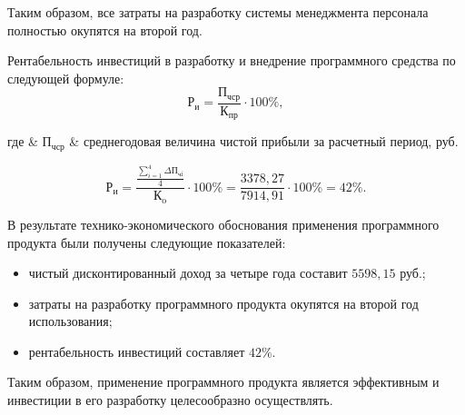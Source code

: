 Таким образом, все затраты на разработку системы менеджмента персонала полностью окупятся на второй год.

Рентабельность инвестиций в разработку и внедрение программного средства по следующей формуле:
\begin{equation}
  \text{Р}_\text{и} = \frac{\text{П}_\text{чср}}{\text{К}_\text{пр}} \cdot 100\%,
\end{equation}
\begin{explanation}
  где & $ \text{П}_\text{чср} $ & среднегодовая величина чистой прибыли за расчетный период, руб.
\end{explanation}
\pagebreak
\begin{equation*}
  \text{Р}_\text{и} = \frac{\frac{\sum_{i=1}^{4} \Delta\text{П}_\text{чi}}{4}}{\text{К}_\text{o}} \cdot 100\% = \frac{3378,27}{7914,91} \cdot 100\% = 42\%.
\end{equation*}
\setlength{\parskip}{0pt}

В результате технико-экономического обоснования применения программного продукта были получены следующие показателей:
\begin{itemize}
	\item чистый дисконтированный доход за четыре года составит $5598,15$ руб.;
	\item затраты на разработку программного продукта окупятся на второй год использования;
	\item рентабельность инвестиций составляет $42\%$.
\end{itemize}

Таким образом, применение программного продукта является эффективным и инвестиции в его разработку целесообразно
осуществлять.
